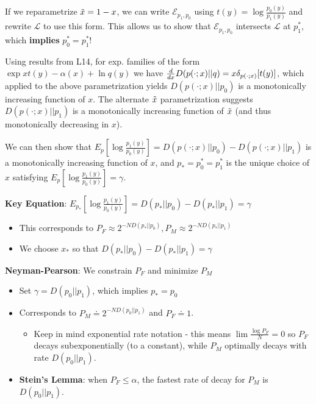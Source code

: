 \documentclass[12pt]{article} %
\begin{document}
If we reparametrize $\Tilde{x} = 1 - x$, we can write $\mathcal{E}_{p_1, p_0}$ using $t(y) = \log \frac{p_0(y)}{p_1(y)}$ and rewrite $\mathcal{L}$ to use this form. This allows us to show that $\mathcal{E}_{p_1,p_0}$ intersects $\mathcal{L}$ at $p_1^*$, which \textbf{implies} ${p_0^* = p_1^*}$!

\separate

Using results from L14, for exp. families of the form $\exp{x t(y) - \alpha(x) + \ln q(y)}$ we have $\frac{d}{dx} D(p(\cdot;x)||q) = x \var_{p(\cdot;x)}[t(y)]$, which applied to the above parametrization yields $D(p(\cdot;x)||p_0)$ is a monotonically increasing function of $x$. The alternate $\Tilde{x}$ parametrization suggests $D(p(\cdot;x)||p_1)$ is a monotonically increasing function of $\Tilde{x}$ (and thus monotonically decreasing in $x$).

We can then show that $E_p[\log \frac{p_1(y)}{p_0(y)}] = D(p(\cdot;x)||p_0) - D(p(\cdot; x)||p_1)$ is a monotonically increasing function of $x$, and $p_* = p_0^* = p_1^*$ is the unique choice of $x$ satisfying $E_p[\log \frac{p_1(y)}{p_0(y)}] = \gamma$.

\textbf{Key Equation}: $E_{p_*}[\log \frac{p_1(y)}{p_0(y)}] = D(p_*||p_0) - D(p_*||p_1) = \gamma$
\begin{itemize}[topsep=-1pt, itemsep=-1pt]
    \item 
This corresponds to $P_F \approx 2^{-ND(p_*||p_0)}, P_M \approx 2^{-ND(p_*||p_1)}$
    \item 
We choose $x_*$ so that $D(p_*||p_0) - D(p_*||p_1) = \gamma$
\end{itemize}

\separate

\textbf{Neyman-Pearson}: We constrain $P_F$ and minimize $P_M$ 
\begin{itemize}[topsep=-1pt, itemsep=-1pt]
    \item 
Set $\gamma = D(p_0||p_1)$, which implies $p_* = p_0$\
    \item 
Corresponds to $P_M \doteq 2^{-ND(p_0||p_1)}$ and $P_F \doteq 1$. 
\begin{itemize}[topsep=-1pt, itemsep=-1pt]
    \item 
Keep in mind exponential rate notation - this means $\lim \frac{\log P_F}{N} = 0$ so $P_F$ decays subexponentially (to a constant), while $P_M$ optimally decays with rate $D(p_0||p_1)$.
\end{itemize}
    \item 
\textbf{Stein's Lemma}: when $P_F \leq \alpha$, the fastest rate of decay for $P_M$ is $ D(p_0||p_1)$.
\end{itemize}
\end{document}
